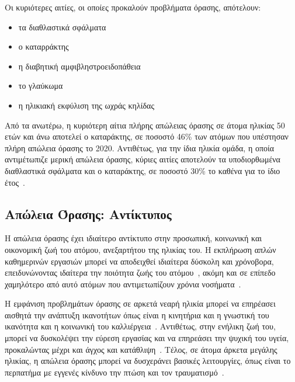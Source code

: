 Οι κυριότερες αιτίες, οι οποίες προκαλούν προβλήματα όρασης, απότελουν:
\begin{itemize}
    \item τα διαθλαστικά σφάλματα
    \item ο καταρράκτης
    \item η διαβητική αμφιβληστροειδοπάθεια
    \item το γλαύκωμα
    \item η ηλικιακή εκφύλιση της ωχράς κηλίδας
\end{itemize}
Από τα ανωτέρω, η κυριότερη αίτια πλήρης απώλειας όρασης σε άτομα ηλικίας 50 ετών και άνω αποτελεί ο καταράκτης, σε ποσοστό 46\% των ατόμων που υπέστησαν πλήρη απώλεια όρασης το 2020. Αντιθέτως, για την ίδια ηλικία ομάδα, η οποία αντιμέτωπιζε μερική απώλεια όρασης, κύριες αιτίες αποτελούν τα υποδιορθωμένα διαθλαστικά σφάλματα και ο καταράκτης, σε ποσοστό 30\% το καθένα για το ίδιο έτος~\cite{adelson_2021_causes}.

\subsection{Απώλεια Όρασης: Αντίκτυπος}\label{subsec:visionImpact}
Η απώλεια όρασης έχει ιδιαίτερο αντίκτυπο στην προσωπική, κοινωνική και οικονομική ζωή του ατόμου, ανεξαρτήτου της ηλικίας του. Η εκπλήρωση απλών καθημερινών εργασιών μπορεί να αποδειχθεί ιδιαίτερα δύσκολη και χρόνοβορα, επειδυνώνοντας ιδαίτερα την ποιότητα ζωής του ατόμου~\cite{west_2002_how}\cite{khorraminejad_2016_the}, ακόμη και σε επίπεδο χαμηλότερο από αυτό ατόμων που αντιμετωπίζουν χρόνια νοσήματα~\cite{langelaan_2007_impact}.



Η εμφάνιση προβλημάτων όρασης σε αρκετά νεαρή ηλικία μπορεί να επηρέασει αισθητά την ανάπτυξη ικανοτήτων όπως είναι η κινητήρια και η γνωστική του ικανότητα και η κοινωνική του καλλιέργεια~\cite{worldhealthorganization_2023_blindness}. Αντιθέτως, στην ενήλικη ζωή του, μπορεί να δυσκολέψει την εύρεση εργασίας και να επηρεάσει την ψυχική του υγεία, προκαλώντας μέχρι και άγχος και κατάθλιψη~\cite{khorraminejad_2016_the}. Τέλος, σε άτομα άρκετα μεγάλης ηλικίας, η απώλεια όρασης μπορεί να δυσχεράνει βασικές λειτουργίες, όπως είναι το περπατήμα με εγγενές κίνδυνο την πτώση και τον τραυματισμό~\cite{worldhealthorganization_2023_blindness}.

